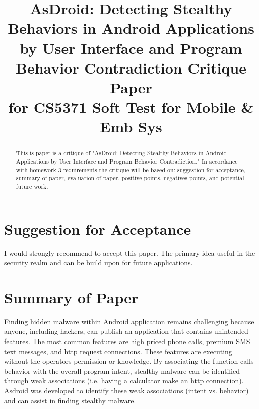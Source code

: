 \documentclass[conference]{IEEEtran}
\begin{document}
\title{AsDroid: Detecting Stealthy Behaviors in Android
Applications by User Interface and Program Behavior
Contradiction Critique Paper\\
for CS5371 Soft Test for Mobile \& Emb Sys}

\author{
}

\maketitle

\begin{abstract}
This is paper is a critique of "AsDroid: Detecting Stealthy Behaviors in Android Applications by User Interface and Program Behavior Contradiction." In accordance with homework 3 requirements the critique will be based on: suggestion for acceptance, summary of paper, evaluation of paper, positive points, negatives points, and potential future work. 
\end{abstract}

\IEEEpeerreviewmaketitle

\section{Suggestion for Acceptance}
I would strongly recommend to accept this paper. The primary idea useful in the security realm and can be build upon for future applications. 

\section{Summary of Paper}
Finding hidden malware within Android application remains challenging because anyone, including hackers, can publish an application that contains unintended features. The most common features are high priced phone calls, premium SMS text messages, and http request connections. These features are executing without the operators permission or knowledge. By associating the function calls behavior with the overall program intent, stealthy malware can be identified through weak associations (i.e. having a calculator make an http connection). Asdroid was developed to identify these weak associations (intent vs. behavior) and can assist in finding stealthy malware.
\end{document}
